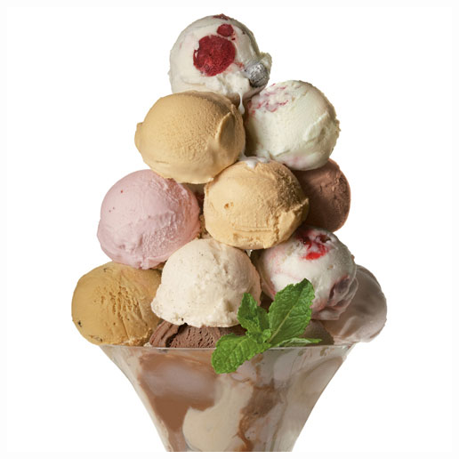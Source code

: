 \documentclass{article}
\begin{document}
\begin{titlepage}
\includegraphics[scale=0.3]{ice_cream.jpg}

\end{titlepage}

\pagebreak

\tableofcontents

\pagebreak

\end{document}
